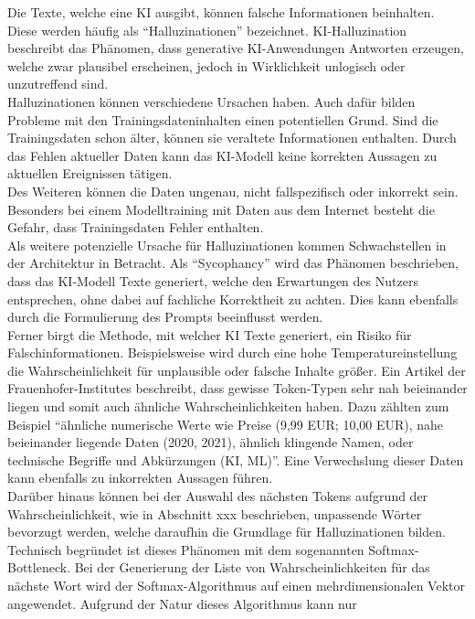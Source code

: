 \documentclass[../main.tex]{subfiles}
\begin{document}
Die Texte, welche eine KI ausgibt, können falsche Informationen beinhalten. Diese werden häufig als "`Halluzinationen"' bezeichnet. KI-Halluzination beschreibt 
das Phänomen, dass generative KI-Anwendungen Antworten erzeugen, welche zwar plausibel erscheinen, jedoch in Wirklichkeit unlogisch oder unzutreffend sind\cite{hallucinationForewarning}.\\
Halluzinationen können verschiedene Ursachen haben. Auch dafür bilden Probleme mit den Trainingsdateninhalten einen potentiellen Grund. Sind die Trainingsdaten schon älter,
können sie veraltete Informationen enthalten. Durch das Fehlen aktueller Daten kann das KI-Modell keine korrekten Aussagen zu aktuellen Ereignissen tätigen.\\ Des 
Weiteren können die Daten ungenau, nicht fallspezifisch oder inkorrekt sein. Besonders bei einem Modelltraining mit Daten aus dem Internet besteht die Gefahr, dass 
Trainingsdaten Fehler enthalten.\\ Als weitere potenzielle Ursache für Halluzinationen kommen Schwachstellen in der Architektur in Betracht. Als "`Sycophancy"' wird das 
Phänomen beschrieben, dass das KI-Modell Texte generiert, welche den Erwartungen des Nutzers entsprechen, ohne dabei auf fachliche Korrektheit zu achten. Dies kann ebenfalls 
durch die Formulierung des Prompts beeinflusst werden.\cite{allgemHalluzinationen} \\
Ferner birgt die Methode, mit welcher KI Texte generiert, ein Risiko für Falschinformationen. Beispielsweise wird durch eine hohe Temperatureinstellung die 
Wahrscheinlichkeit für unplausible oder falsche Inhalte größer. Ein Artikel der Frauenhofer-Institutes beschreibt, dass gewisse Token-Typen sehr nah beieinander liegen 
und somit auch ähnliche Wahrscheinlichkeiten haben. Dazu zählten zum Beispiel "`ähnliche numerische Werte wie Preise (9,99 EUR; 10,00 EUR), nahe beieinander liegende 
Daten (2020, 2021), ähnlich klingende Namen, oder technische Begriffe und Abkürzungen (KI, ML)"'\cite{halluzinationenFraunhofer}. Eine Verwechslung dieser Daten kann ebenfalls zu inkorrekten Aussagen 
führen.\\
Darüber hinaus können bei der Auswahl des nächsten Tokens aufgrund der Wahrscheinlichkeit, wie in Abschnitt xxx beschrieben, unpassende Wörter bevorzugt werden, welche 
daraufhin die Grundlage für Halluzinationen bilden. Technisch begründet ist dieses Phänomen mit dem sogenannten Softmax-Bottleneck. Bei der Generierung der Liste von 
Wahrscheinlichkeiten für das nächste Wort wird der Softmax-Algorithmus auf einen mehrdimensionalen Vektor angewendet. Aufgrund der Natur dieses Algorithmus kann nur 
\end{document}
